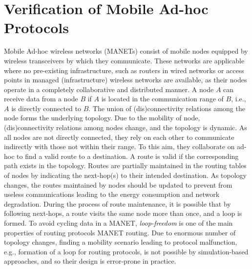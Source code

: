 \section{Verification of Mobile Ad-hoc Protocols}\label{sec::wrebeca} 
Mobile Ad-hoc wireless networks (MANETs) consist of mobile nodes equipped by wireless transceivers by which they communicate. These networks are applicable where no pre-existing infrastructure, such as routers in wired networks or access points in managed (infrastructure) wireless networks are available, as their nodes operate in a completely collaborative and distributed manner. A node $A$ can receive data from a node $B$ if $A$ is located in the communication range of $B$, i.e., $A$ is directly connected to $B$. The union of (dis)connectivity relations among the node forms the underlying topology.  Due to the mobility of node, (dis)connectivity relations among nodes change, and the topology is dynamic. As all nodes are not directly connected, they rely on each other to communicate indirectly with those not within their range. To this aim, they collaborate on ad-hoc to find a valid route to a destination. A route is valid if the corresponding path exists in the topology. Routes are partially maintained in the routing tables of nodes by indicating the next-hop(s) to their intended destination. As topology changes, the routes maintained by nodes should be updated to prevent from useless communications leading to the energy consumption and network degradation. During the process of route maintenance, it is possible that by following next-hops, a route visits the same node more than once, and a loop is formed. To avoid cycling data in a MANET, \emph{loop-freedom} is one of the main properties of routing protocols MANET routing. Due to enormous number of topology changes, finding a mobility scenario leading to protocol malfunction, e.g., formation of a loop for routing protocols,  %
is not possible by simulation-based approaches, and so their design is error-prone in practice.   %


